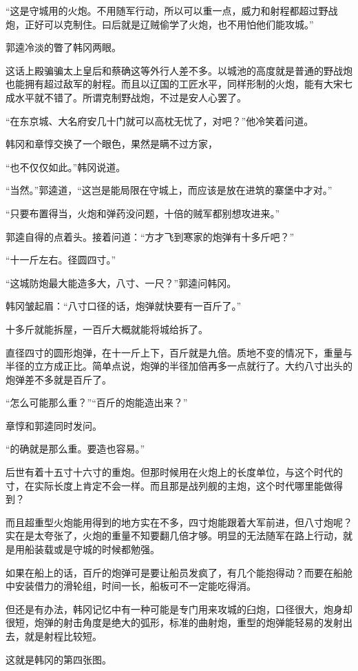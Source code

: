 “这是守城用的火炮。不用随军行动，所以可以重一点，威力和射程都超过野战炮，正好可以克制住。曰后就是辽贼偷学了火炮，也不用怕他们能攻城。”

郭逵冷淡的瞥了韩冈两眼。

这话上殿骗骗太上皇后和蔡确这等外行人差不多。以城池的高度就是普通的野战炮也能拥有超过敌军的射程。而且以辽国的工匠水平，同样形制的火炮，能有大宋七成水平就不错了。所谓克制野战炮，不过是安人心罢了。

“在东京城、大名府安几十门就可以高枕无忧了，对吧？”他冷笑着问道。

韩冈和章惇交换了一个眼色，果然是瞒不过方家，

“也不仅仅如此。”韩冈说道。

“当然。”郭逵道，“这岂是能局限在守城上，而应该是放在进筑的寨堡中才对。”

“只要布置得当，火炮和弹药没问题，十倍的贼军都别想攻进来。”

郭逵自得的点着头。接着问道：“方才飞到寒家的炮弹有十多斤吧？”

“十一斤左右。径圆四寸。”

“这城防炮最大能造多大，八寸、一尺？”郭逵问韩冈。

韩冈皱起眉：“八寸口径的话，炮弹就快要有一百斤了。”

十多斤就能拆屋，一百斤大概就能将城给拆了。

直径四寸的圆形炮弹，在十一斤上下，百斤就是九倍。质地不变的情况下，重量与半径的立方成正比。简单点说，炮弹的半径加倍再多一点就行了。大约八寸出头的炮弹差不多就是百斤了。

“怎么可能那么重？”“百斤的炮能造出来？”

章惇和郭逵同时发问。

“的确就是那么重。要造也容易。”

后世有着十五寸十六寸的重炮。但那时候用在火炮上的长度单位，与这个时代的寸，在实际长度上肯定不会一样。而且那是战列舰的主炮，这个时代哪里能做得到？

而且超重型火炮能用得到的地方实在不多，四寸炮能跟着大军前进，但八寸炮呢？实在是太夸张了，火炮的重量不知要翻几倍才够。明显的无法随军在路上行动，就是用船装载或是守城的时候都勉强。

如果在船上的话，百斤的炮弹可是要让船员发疯了，有几个能抱得动？而要在船舱中安装借力的滑轮组，时间一长，船板可不一定能吃得消。

但还是有办法，韩冈记忆中有一种可能是专门用来攻城的臼炮，口径很大，炮身却很短，炮弹的射击角度是绝大的弧形，标准的曲射炮，重型的炮弹能轻易的发射出去，就是射程比较短。

这就是韩冈的第四张图。

